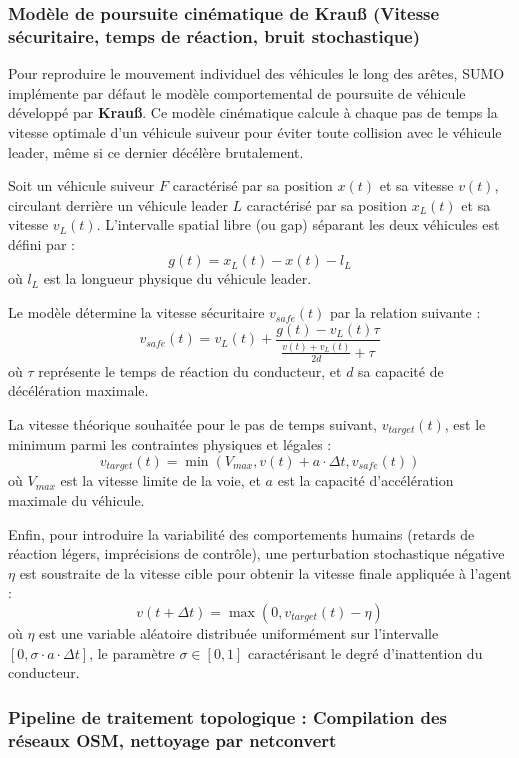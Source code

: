 \documentclass[10pt, a4paper]{article}
\begin{document}
\subsubsection{Modèle de poursuite cinématique de Krauß (Vitesse
sécuritaire, temps de réaction, bruit
stochastique)}\label{moduxe8le-de-poursuite-cinuxe9matique-de-krauuxdf-vitesse-suxe9curitaire-temps-de-ruxe9action-bruit-stochastique}

Pour reproduire le mouvement individuel des véhicules le long des
arêtes, SUMO implémente par défaut le modèle comportemental de poursuite
de véhicule développé par \textbf{Krauß}. Ce modèle cinématique calcule
à chaque pas de temps la vitesse optimale d'un véhicule suiveur pour
éviter toute collision avec le véhicule leader, même si ce dernier
décélère brutalement.

Soit un véhicule suiveur \(F\) caractérisé par sa position \(x(t)\) et
sa vitesse \(v(t)\), circulant derrière un véhicule leader \(L\)
caractérisé par sa position \(x_L(t)\) et sa vitesse \(v_L(t)\).
L'intervalle spatial libre (ou gap) séparant les deux véhicules est
défini par : \[g(t) = x_L(t) - x(t) - l_L\] où \(l_L\) est la longueur
physique du véhicule leader.

Le modèle détermine la vitesse sécuritaire \(v_{safe}(t)\) par la
relation suivante :
\[v_{safe}(t) = v_L(t) + \frac{g(t) - v_L(t)\tau}{\frac{v(t) + v_L(t)}{2d} + \tau}\]
où \(\tau\) représente le temps de réaction du conducteur, et \(d\) sa
capacité de décélération maximale.

La vitesse théorique souhaitée pour le pas de temps suivant,
\(v_{target}(t)\), est le minimum parmi les contraintes physiques et
légales :
\[v_{target}(t) = \min\left( V_{max}, v(t) + a \cdot \Delta t, v_{safe}(t) \right)\]
où \(V_{max}\) est la vitesse limite de la voie, et \(a\) est la
capacité d'accélération maximale du véhicule.

Enfin, pour introduire la variabilité des comportements humains (retards
de réaction légers, imprécisions de contrôle), une perturbation
stochastique négative \(\eta\) est soustraite de la vitesse cible pour
obtenir la vitesse finale appliquée à l'agent :
\[v(t + \Delta t) = \max\left( 0, v_{target}(t) - \eta \right)\] où
\(\eta\) est une variable aléatoire distribuée uniformément sur
l'intervalle \([0, \sigma \cdot a \cdot \Delta t]\), le paramètre
\(\sigma \in [0, 1]\) caractérisant le degré d'inattention du
conducteur.

\subsubsection{Pipeline de traitement topologique : Compilation des
réseaux OSM, nettoyage par
netconvert}\label{pipeline-de-traitement-topologique-compilation-des-ruxe9seaux-osm-nettoyage-par-netconvert}
\end{document}
